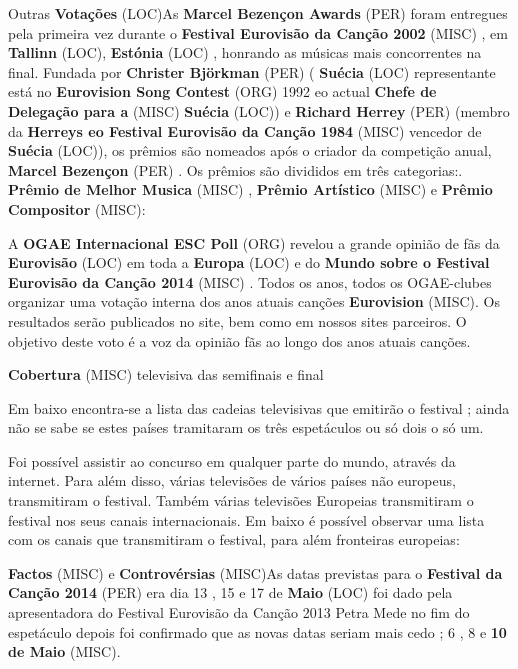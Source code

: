 \documentclass[12pt,a4paper]{article}
\begin{document}
Outras \textbf{Votações} (LOC)As \textbf{Marcel Bezençon Awards} (PER) foram entregues pela primeira vez durante o \textbf{Festival Eurovisão da Canção 2002} (MISC) , em \textbf{Tallinn} (LOC), \textbf{Estónia} (LOC) , honrando as músicas mais concorrentes na final. Fundada por \textbf{Christer Björkman} (PER) ( \textbf{Suécia} (LOC) representante está no \textbf{Eurovision Song Contest} (ORG) 1992 eo actual \textbf{Chefe de Delegação para a} (MISC) \textbf{Suécia} (LOC)) e \textbf{Richard Herrey} (PER) (membro da \textbf{Herreys eo Festival Eurovisão da Canção 1984} (MISC) vencedor de \textbf{Suécia} (LOC)), os prêmios são nomeados após o criador da competição anual, \textbf{Marcel Bezençon} (PER) . Os prêmios são divididos em três categorias:. \textbf{Prêmio de Melhor Musica} (MISC) , \textbf{Prêmio Artístico} (MISC) e \textbf{Prêmio Compositor} (MISC):

A \textbf{OGAE Internacional ESC Poll} (ORG) revelou a grande opinião de fãs da \textbf{Eurovisão} (LOC) em toda a \textbf{Europa} (LOC) e do \textbf{Mundo sobre o Festival Eurovisão da Canção 2014} (MISC) . Todos os anos, todos os OGAE-clubes organizar uma votação interna dos anos atuais canções \textbf{Eurovision} (MISC). Os resultados serão publicados no site, bem como em nossos sites parceiros. O objetivo deste voto é a voz da opinião fãs ao longo dos anos atuais canções.



\textbf{Cobertura} (MISC) televisiva das semifinais e final

Em baixo encontra-se a lista das cadeias televisivas que emitirão o festival ; ainda não se sabe se estes países tramitaram os três espetáculos ou só dois o só um.

Foi possível assistir ao concurso em qualquer parte do mundo, através da internet. Para além disso, várias televisões de vários países não europeus, transmitiram o festival. Também várias televisões Europeias transmitiram o festival nos seus canais internacionais. Em baixo é possível observar uma lista com os canais que transmitiram o festival, para além fronteiras europeias:



\textbf{Factos} (MISC) e \textbf{Controvérsias} (MISC)As datas previstas para o \textbf{Festival da Canção 2014} (PER) era dia 13 , 15 e 17 de \textbf{Maio} (LOC) foi dado pela apresentadora do Festival Eurovisão da Canção 2013 Petra Mede no fim do espetáculo depois foi confirmado que as novas datas seriam mais cedo ; 6 , 8 e \textbf{10 de Maio} (MISC).
\end{document}
